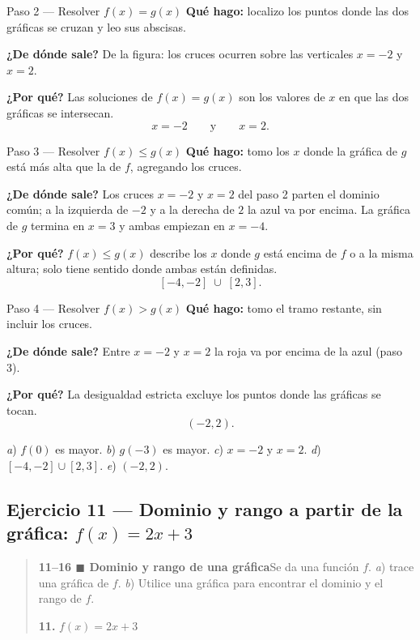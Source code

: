 \documentclass[11pt]{article}
\begin{document}
\begin{paso}{Paso 2 --- Resolver $f(x)=g(x)$}
\textbf{Qué hago:} localizo los puntos donde las dos gráficas se cruzan y leo sus abscisas.

\textbf{¿De dónde sale?} De la figura: los cruces ocurren sobre las verticales $x=-2$ y $x=2$.

\textbf{¿Por qué?} Las soluciones de $f(x)=g(x)$ son los valores de $x$ en que las dos gráficas se intersecan.
\[
x=-2 \qquad\text{y}\qquad x=2.
\]
\end{paso}

\begin{paso}{Paso 3 --- Resolver $f(x)\le g(x)$}
\textbf{Qué hago:} tomo los $x$ donde la gráfica de $g$ está más alta que la de $f$, agregando los cruces.

\textbf{¿De dónde sale?} Los cruces $x=-2$ y $x=2$ del paso 2 parten el dominio común; a la izquierda de $-2$ y a la derecha de $2$ la azul va por encima. La gráfica de $g$ termina en $x=3$ y ambas empiezan en $x=-4$.

\textbf{¿Por qué?} $f(x)\le g(x)$ describe los $x$ donde $g$ está encima de $f$ o a la misma altura; solo tiene sentido donde ambas están definidas.
\[
[-4,-2]\;\cup\;[2,3].
\]
\end{paso}

\begin{paso}{Paso 4 --- Resolver $f(x)>g(x)$}
\textbf{Qué hago:} tomo el tramo restante, sin incluir los cruces.

\textbf{¿De dónde sale?} Entre $x=-2$ y $x=2$ la roja va por encima de la azul (paso 3).

\textbf{¿Por qué?} La desigualdad estricta excluye los puntos donde las gráficas se tocan.
\[
(-2,2).
\]
\end{paso}

\begin{resp}
\emph{a}) $f(0)$ es mayor. \quad \emph{b}) $g(-3)$ es mayor. \quad \emph{c}) $x=-2$ y $x=2$. \quad
\emph{d}) $[-4,-2]\cup[2,3]$. \quad \emph{e}) $(-2,2)$.
\end{resp}

\subsection*{Ejercicio 11 — Dominio y rango a partir de la gráfica: $f(x)=2x+3$}

\begin{quote}
\textbf{11--16 $\blacksquare$ Dominio y rango de una gráfica}\quad Se da una función $f$. \emph{a}) trace una gráfica de $f$. \emph{b}) Utilice una gráfica para encontrar el dominio y el rango de $f$.

\textbf{11.} $f(x)=2x+3$
\end{quote}
\end{document}
